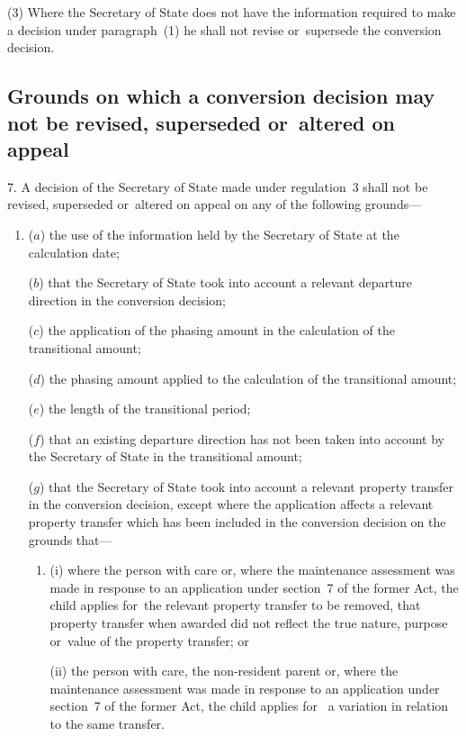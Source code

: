 \documentclass[12pt,a4paper]{article}
\begin{document}
(3) Where the Secretary of State does not have the information required to make a decision under paragraph~(1) he shall not revise or~supersede the conversion decision.

\subsection[7. Grounds on which a conversion decision may not be revised, superseded or~altered on appeal]{Grounds on which a conversion decision may not be revised, superseded or~altered on appeal}

7.  A decision of the Secretary of State made under regulation~3 shall not be revised, superseded or~altered on appeal on any of the following grounds—
\begin{enumerate}\item[]
($a$) the use of the information held by the Secretary of State at the calculation date;

($b$) that the Secretary of State took into account a relevant departure direction in the conversion decision;

($c$) the application of the phasing amount in the calculation of the transitional amount;

($d$) the phasing amount applied to the calculation of the transitional amount;

($e$) the length of the transitional period;

($f$) that an existing departure direction has not been taken into account by the Secretary of State in the transitional amount;

($g$) that the Secretary of State took into account a relevant property transfer in the conversion decision, except where the application affects a relevant property transfer which has been included in the conversion decision on the grounds that—
\begin{enumerate}\item[]
(i) where the person with care or, where the maintenance assessment was made in response to an application under section~7 of the former Act, the child applies for~the relevant property transfer to be removed, that property transfer when awarded did not reflect the true nature, purpose or~value of the property transfer; or

(ii) 
the person with care, the non-resident parent or, where the maintenance assessment was made in response to an application under section~7 of the former Act, the child applies for~
a variation in relation to the same transfer.
\end{enumerate}
\end{enumerate}
\end{document}
